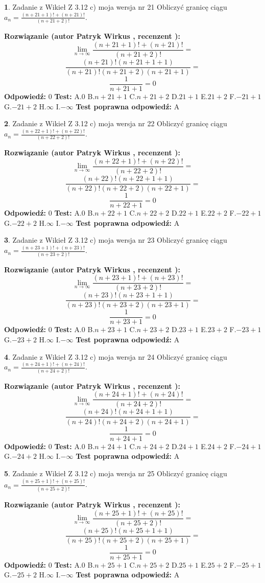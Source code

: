 \documentclass[12pt, a4paper]{article}
\theoremstyle{definition} %
\newtheorem{zad}{}
\newcommand{\zadStart}[1]{\begin{zad}#1\newline}
\newcommand{\zadStop}{\end{zad}}
\newcommand{\rozwStart}[2]{\noindent \textbf{Rozwiązanie (autor #1 , recenzent #2): }\newline}
\newcommand{\rozwStop}{\newline}
\newcommand{\odpStart}{\noindent \textbf{Odpowiedź:}\newline}
\newcommand{\odpStop}{\newline}
\newcommand{\testStart}{\noindent \textbf{Test:}\newline}
\newcommand{\testStop}{\newline}
\newcommand{\kluczStart}{\noindent \textbf{Test poprawna odpowiedź:}\newline}
\newcommand{\kluczStop}{\newline}
\begin{document}
\zadStart{Zadanie z Wikieł Z 3.12 c) moja wersja nr 21}
Obliczyć granicę ciągu $a_{n}=\frac{(n+21+1)!+(n+21)!}{(n+21+2)!}$.
\zadStop
\rozwStart{Patryk Wirkus}{}
$$\lim\limits_{n\to\infty}\frac{(n+21+1)!+(n+21)!}{(n+21+2)!}=$$
$$\frac{(n+21)!(n+21+1+1)}{(n+21)!(n+21+2)(n+21+1)}=$$
$$\frac{1}{n+21+1}= 0$$
\rozwStop
\odpStart
$0$
\odpStop
\testStart
A.$0$
B.$n+21+1$
C.$n+21+2$
D.$21+1$
E.$21+2$
F.$-21+1$
G.$-21+2$
H.$\infty$
I.$-\infty$
\testStop
\kluczStart
A
\kluczStop



\zadStart{Zadanie z Wikieł Z 3.12 c) moja wersja nr 22}
Obliczyć granicę ciągu $a_{n}=\frac{(n+22+1)!+(n+22)!}{(n+22+2)!}$.
\zadStop
\rozwStart{Patryk Wirkus}{}
$$\lim\limits_{n\to\infty}\frac{(n+22+1)!+(n+22)!}{(n+22+2)!}=$$
$$\frac{(n+22)!(n+22+1+1)}{(n+22)!(n+22+2)(n+22+1)}=$$
$$\frac{1}{n+22+1}= 0$$
\rozwStop
\odpStart
$0$
\odpStop
\testStart
A.$0$
B.$n+22+1$
C.$n+22+2$
D.$22+1$
E.$22+2$
F.$-22+1$
G.$-22+2$
H.$\infty$
I.$-\infty$
\testStop
\kluczStart
A
\kluczStop



\zadStart{Zadanie z Wikieł Z 3.12 c) moja wersja nr 23}
Obliczyć granicę ciągu $a_{n}=\frac{(n+23+1)!+(n+23)!}{(n+23+2)!}$.
\zadStop
\rozwStart{Patryk Wirkus}{}
$$\lim\limits_{n\to\infty}\frac{(n+23+1)!+(n+23)!}{(n+23+2)!}=$$
$$\frac{(n+23)!(n+23+1+1)}{(n+23)!(n+23+2)(n+23+1)}=$$
$$\frac{1}{n+23+1}= 0$$
\rozwStop
\odpStart
$0$
\odpStop
\testStart
A.$0$
B.$n+23+1$
C.$n+23+2$
D.$23+1$
E.$23+2$
F.$-23+1$
G.$-23+2$
H.$\infty$
I.$-\infty$
\testStop
\kluczStart
A
\kluczStop



\zadStart{Zadanie z Wikieł Z 3.12 c) moja wersja nr 24}
Obliczyć granicę ciągu $a_{n}=\frac{(n+24+1)!+(n+24)!}{(n+24+2)!}$.
\zadStop
\rozwStart{Patryk Wirkus}{}
$$\lim\limits_{n\to\infty}\frac{(n+24+1)!+(n+24)!}{(n+24+2)!}=$$
$$\frac{(n+24)!(n+24+1+1)}{(n+24)!(n+24+2)(n+24+1)}=$$
$$\frac{1}{n+24+1}= 0$$
\rozwStop
\odpStart
$0$
\odpStop
\testStart
A.$0$
B.$n+24+1$
C.$n+24+2$
D.$24+1$
E.$24+2$
F.$-24+1$
G.$-24+2$
H.$\infty$
I.$-\infty$
\testStop
\kluczStart
A
\kluczStop



\zadStart{Zadanie z Wikieł Z 3.12 c) moja wersja nr 25}
Obliczyć granicę ciągu $a_{n}=\frac{(n+25+1)!+(n+25)!}{(n+25+2)!}$.
\zadStop
\rozwStart{Patryk Wirkus}{}
$$\lim\limits_{n\to\infty}\frac{(n+25+1)!+(n+25)!}{(n+25+2)!}=$$
$$\frac{(n+25)!(n+25+1+1)}{(n+25)!(n+25+2)(n+25+1)}=$$
$$\frac{1}{n+25+1}= 0$$
\rozwStop
\odpStart
$0$
\odpStop
\testStart
A.$0$
B.$n+25+1$
C.$n+25+2$
D.$25+1$
E.$25+2$
F.$-25+1$
G.$-25+2$
H.$\infty$
I.$-\infty$
\testStop
\kluczStart
A
\kluczStop
\end{document}
